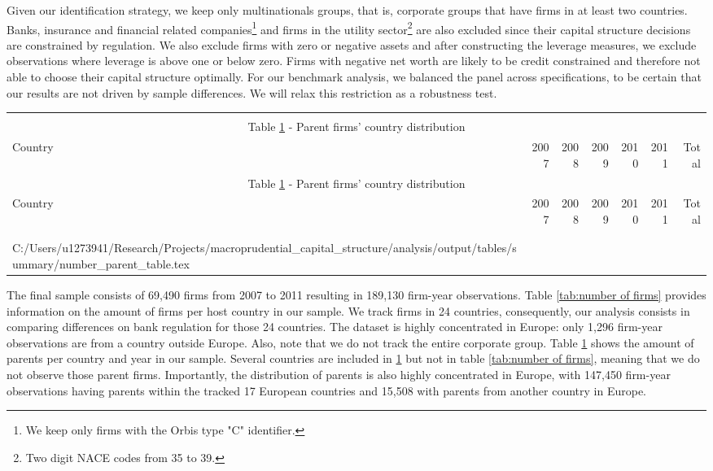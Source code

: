 \documentclass[12pt]{article}
\makeatletter
\newcommand\primitiveinput[1]
{\@@input #1 }
\makeatother
\begin{document}
	Given our identification strategy, we keep only multinationals groups, that is, corporate groups that have firms in at least two countries.  Banks, insurance and financial related companies\footnote{We keep only firms with the Orbis type "C" identifier.} and firms in the utility sector\footnote{Two digit NACE codes from 35 to 39.} are also excluded since their capital structure decisions are constrained by regulation. We also exclude firms with zero or negative assets and after constructing the leverage measures, we exclude observations where leverage is above one or below zero. Firms with negative net worth are likely to be credit constrained and therefore not able to choose their capital structure optimally. For our benchmark analysis, we balanced the panel across specifications, to be certain that our results are not driven by sample differences. We will relax this restriction as a robustness test.
	
		\begin{small}
		{
			\begin{longtable}{lrrrrrr}\\
				\label{tab:number of parent}\\
				\multicolumn{7}{c}{Table \ref{tab:number of parent} - Parent firms' country distribution}\\
				\hline \hline \addlinespace Country & 2007 & 2008 & 2009 & 2010 & 2011 & Total  \\
				\endfirsthead
				\multicolumn{7}{c}{Table \ref{tab:number of parent} - Parent firms' country distribution}\\
				\hline \hline \addlinespace Country & 2007 & 2008 & 2009 & 2010 & 2011 & Total  \\
				\hline \addlinespace \endhead
				\hline
				\multicolumn{7}{r}{{\textit{(Continued)}}}\\ \endfoot
				\\ 	
				\endlastfoot
				\primitiveinput{C:/Users/u1273941/Research/Projects/macroprudential_capital_structure/analysis/output/tables/summary/number_parent_table.tex}
				\hline 			
			\end{longtable}	
		}
	\end{small}

	The final sample consists of 69,490 firms from 2007 to 2011 resulting in 189,130 firm-year observations. Table \ref{tab:number of firms} provides information on the amount of firms per host country in our sample. We track firms in 24 countries, consequently, our analysis consists in comparing differences on bank regulation for those 24 countries. The dataset is highly concentrated in Europe: only 1,296 firm-year observations are from a country outside Europe. Also, note that we do not track the entire corporate group. Table \ref{tab:number of parent} shows the amount of parents per country and year in our sample. Several countries are included in \ref{tab:number of parent} but not in table \ref{tab:number of firms}, meaning that we do not observe those parent firms. Importantly, the distribution of parents is also highly concentrated in Europe, with 147,450 firm-year observations having parents within the tracked 17 European countries and 15,508 with parents from another country in Europe.
	
\end{document}
